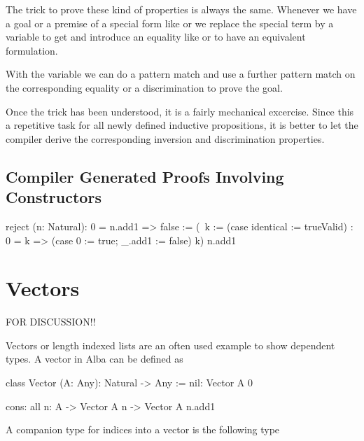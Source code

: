 The trick to prove these kind of properties is always the same. Whenever we have
a goal or a premise of a special form like  or
 we replace the special term by a variable to get
 and introduce an equality like  or  to have an equivalent formulation.

With the variable we can do a pattern match and use a further pattern match on
the corresponding equality or a discrimination to prove the goal.

Once the trick has been understood, it is a fairly mechanical excercise. Since
this a repetitive task for all newly defined inductive propositions, it is
better to let the compiler derive the corresponding inversion and discrimination
properties.



\subsection{Compiler Generated Proofs Involving Constructors}



\begin{alba}
    reject (n: Natural): 0 = n.add1 => false
    :=
        (\ k :=
            (case identical := trueValid)
            : 0 = k
              =>
              (case 0 := true; _.add1 := false) k)
          n.add1
\end{alba}


\begin{alba}
\end{alba}





\section{Vectors}


FOR DISCUSSION!!


Vectors or length indexed lists are an often used example to show dependent
types. A vector in Alba can be defined as

\begin{alba}
    class
        Vector (A: Any): Natural -> Any
    :=
        nil: Vector A 0

        cons: all n: A -> Vector A n -> Vector A n.add1
\end{alba}

A companion type for indices into a vector is the following type

